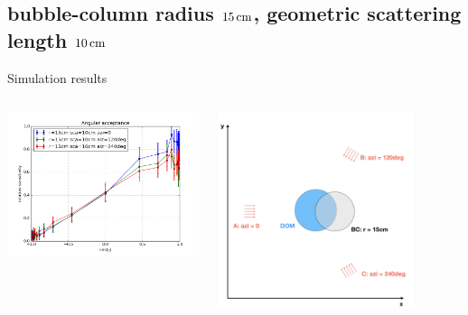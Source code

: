 \subsection{bubble-column radius $15\text{\,cm}$, geometric scattering length $10\text{\,cm}$}
\begin{frame}[fragile]{Simulation results}
  \begin{columns}
    \begin{column}{0.5\textwidth}
      \includegraphics[width=\textwidth]{img/summer_scenario_r15cm_sca10cm}
    \end{column}
    \begin{column}{0.5\textwidth}
      \includegraphics[width=0.8\textwidth]{img/summerscenario-004}
    \end{column}
  \end{columns}


\end{frame}
